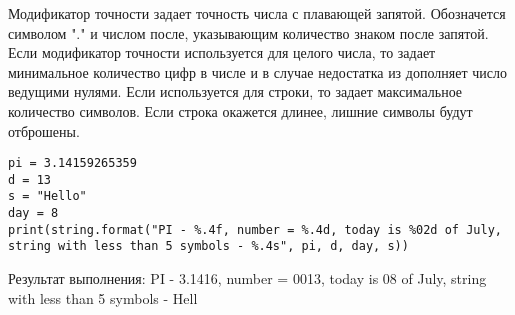 \begin{enumerate}
Модификатор точности задает точность числа с плавающей запятой. Обозначется символом "." и числом после, указывающим количество знаком после запятой. Если модификатор точности используется для целого числа, то задает минимальное количество цифр в числе и в случае недостатка из дополняет число ведущими нулями. Если используется для строки, то задает максимальное количество символов. Если строка окажется длинее, лишние символы будут отброшены. 

\begin{lstlisting}
pi = 3.14159265359
d = 13
s = "Hello"
day = 8
print(string.format("PI - %.4f, number = %.4d, today is %02d of July, string with less than 5 symbols - %.4s", pi, d, day, s))
\end{lstlisting} 

Результат выполнения:
PI - 3.1416, number = 0013, today is 08 of July, string with less than 5 symbols - Hell

\end{enumerate} 